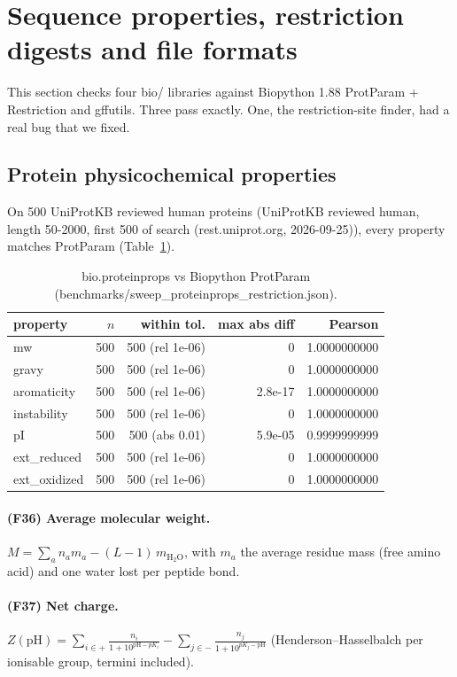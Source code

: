 \section{Sequence properties, restriction digests and file formats}
This section checks four bio/ libraries against Biopython 1.88 ProtParam + Restriction and gffutils. Three pass exactly. One, the restriction-site finder, had a real bug that we fixed.
\subsection{Protein physicochemical properties}
On 500 UniProtKB reviewed human proteins (UniProtKB reviewed human, length 50-2000, first 500 of search (rest.uniprot.org, 2026-09-25)), every property matches ProtParam (Table~\ref{tab:pp}).
\begin{table}[h]\centering\small\begin{tabular}{lrrrr}\hline property & $n$ & within tol. & max abs diff & Pearson\\\hline
mw & 500 & 500 (rel 1e-06) & 0 & 1.0000000000\\
gravy & 500 & 500 (rel 1e-06) & 0 & 1.0000000000\\
aromaticity & 500 & 500 (rel 1e-06) & 2.8e-17 & 1.0000000000\\
instability & 500 & 500 (rel 1e-06) & 0 & 1.0000000000\\
pI & 500 & 500 (abs 0.01) & 5.9e-05 & 0.9999999999\\
ext\_reduced & 500 & 500 (rel 1e-06) & 0 & 1.0000000000\\
ext\_oxidized & 500 & 500 (rel 1e-06) & 0 & 1.0000000000\\
\hline\end{tabular}\caption{bio.proteinprops vs Biopython ProtParam (benchmarks/sweep\_proteinprops\_restriction.json).}\label{tab:pp}\end{table}
\paragraph{(F36) Average molecular weight.} $M=\sum_a n_a m_a-(L-1)\,m_{\mathrm{H_2O}}$, with $m_a$ the average residue mass (free amino acid) and one water lost per peptide bond.
\paragraph{(F37) Net charge.} $Z(\mathrm{pH})=\sum_{i\in +}\frac{n_i}{1+10^{\mathrm{pH}-pK_i}}-\sum_{j\in -}\frac{n_j}{1+10^{pK_j-\mathrm{pH}}}$ (Henderson--Hasselbalch per ionisable group, termini included).
